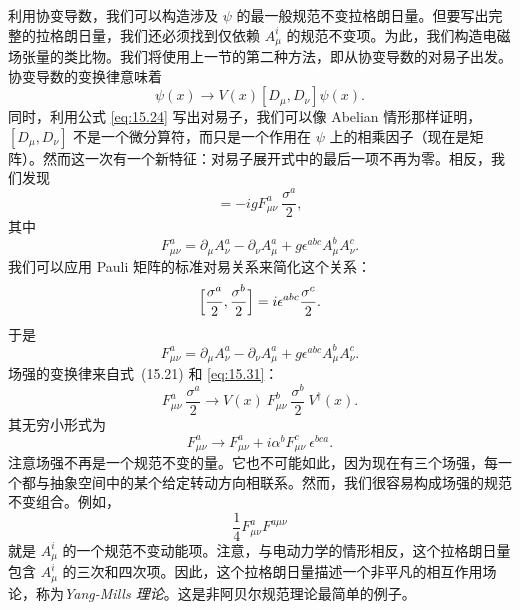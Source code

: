 利用协变导数，我们可以构造涉及 $\psi$ 的最一般规范不变拉格朗日量。但要写出完整的拉格朗日量，我们还必须找到仅依赖 $A_\mu^i$ 的规范不变项。为此，我们构造电磁场张量的类比物。我们将使用上一节的第二种方法，即从协变导数的对易子出发。协变导数的变换律意味着
\begin{equation}
  [D_\mu, D_\nu]\psi(x) \to V(x)[D_\mu, D_\nu]\psi(x) .
  \label{eq:15.31}
\end{equation}
同时，利用公式 \eqref{eq:15.24} 写出对易子，我们可以像 Abelian 情形那样证明，$[D_\mu, D_\nu]$ 不是一个微分算符，而只是一个作用在 $\psi$ 上的相乘因子（现在是矩阵）。然而这一次有一个新特征：对易子展开式中的最后一项不再为零。相反，我们发现
\begin{equation}
  [D_\mu, D_\nu] = -igF^a_{\mu\nu}\ \frac{\sigma^a}{2} ,
  \label{eq:15.32}
\end{equation}
其中
\begin{equation}
  F^a_{\mu\nu} = \partial_\mu A_\nu^a - \partial_\nu A_\mu^a
    + g\epsilon^{abc}A_\mu^b A_\nu^c .
  \label{eq:15.33}
\end{equation}
我们可以应用 Pauli 矩阵的标准对易关系来简化这个关系：
\begin{equation}
  \Bigl[ \frac{\sigma^a}{2}, \frac{\sigma^b}{2} \Bigr] = i\epsilon^{abc}
    \frac{\sigma^c}{2} .
  \label{eq:15.34}
\end{equation}
于是
\begin{equation}
  F^a_{\mu\nu} = \partial_\mu A_\nu^a - \partial_\nu A_\mu^a
    + g\epsilon^{abc}A_\mu^b A_\nu^c .
  \label{eq:15.35}
\end{equation}
场强的变换律来自式~(15.21) 和 \eqref{eq:15.31}：
\begin{equation}
  F^a_{\mu\nu}\ \frac{\sigma^a}{2} \to V(x)\ F^b_{\mu\nu}\ \frac{\sigma^b}{2}\
    V^{\dagger}(x) .
  \label{eq:15.36}
\end{equation}
其无穷小形式为
\begin{equation}
  F^a_{\mu\nu} \to F^a_{\mu\nu} + i\alpha^b F^c_{\mu\nu}\ \epsilon^{bca} .
  \label{eq:15.37}
\end{equation}
注意场强不再是一个规范不变的量。它也不可能如此，因为现在有三个场强，每一个都与抽象空间中的某个给定转动方向相联系。然而，我们很容易构成场强的规范不变组合。例如，
\begin{equation}
  \frac{1}{4}F^a_{\mu\nu}F^{a\mu\nu}
  \label{eq:15.38}
\end{equation}
就是 $A_\mu^i$ 的一个规范不变动能项。注意，与电动力学的情形相反，这个拉格朗日量包含 $A_\mu^i$ 的三次和四次项。因此，这个拉格朗日量描述一个非平凡的相互作用场论，称为\emph{Yang-Mills 理论}。这是非阿贝尔规范理论最简单的例子。

